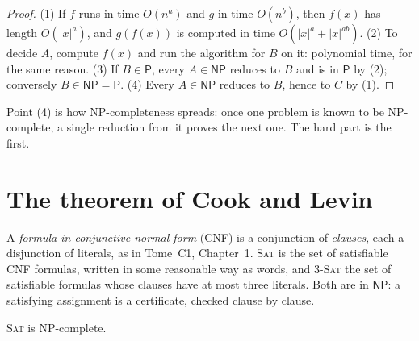 \begin{proof}
(1) If $f$ runs in time $O(n^a)$ and $g$ in time $O(n^b)$, then $f(x)$ has length $O(|x|^a)$, and $g(f(x))$ is computed in time $O(|x|^a+|x|^{ab})$. (2) To decide $A$, compute $f(x)$ and run the algorithm for $B$ on it: polynomial time, for the same reason. (3) If $B\in\mathsf P$, every $A\in\mathsf{NP}$ reduces to $B$ and is in $\mathsf P$ by (2); conversely $B\in\mathsf{NP}=\mathsf P$. (4) Every $A\in\mathsf{NP}$ reduces to $B$, hence to $C$ by (1).
\end{proof}

Point (4) is how NP-completeness spreads: once one problem is known to be NP-complete, a single reduction from it proves the next one. The hard part is the first.

\section{The theorem of Cook and Levin}\label{sec:cooklevin}

A \emph{formula in conjunctive normal form} (CNF) is a conjunction of \emph{clauses}, each a disjunction of literals, as in Tome~C1, Chapter~1. \textup{\textsc{Sat}} is the set of satisfiable CNF formulas, written in some reasonable way as words, and \textup{\textsc{3-Sat}} the set of satisfiable formulas whose clauses have at most three literals. Both are in $\mathsf{NP}$: a satisfying assignment is a certificate, checked clause by clause.

\begin{theorem}\label{thm:cooklevin}
\textup{\textsc{Sat}} is NP-complete.
\end{theorem}

